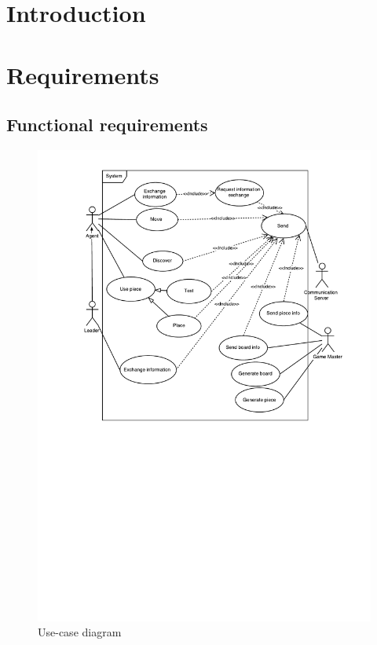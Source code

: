 \documentclass[11pt,a4paper]{article}
\begin{document}
\tableofcontents

\section{Introduction}

\section{Requirements}

\subsection{Functional requirements}

\begin{figure}[H]
\begin{center}
\includegraphics[trim={2cm 10cm 0 0},clip, scale=0.7]{UseCases}
\caption{Use-case diagram}
\end{center}
\end{figure}
\end{document}
